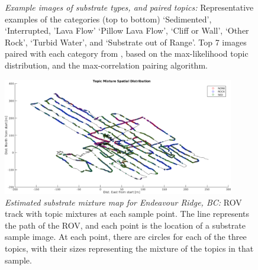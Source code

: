 \begin{figure}
\begin{minipage}{0.69\linewidth}
{            \label{fig:substrate-exout}
        }
    \end{minipage}
  \caption{
  	\emph{Example images of substrate types, and paired topics:}
    \protect{} Representative examples of the categories (top to bottom) `Sedimented', `Interrupted, 'Lava Flow'  `Pillow Lava Flow', `Cliff or Wall', `Other Rock', `Turbid Water', and `Substrate out of Range'.
	\protect{} Top 7 images paired with each category from
	\protect{}, based on the max-likelihood topic distribution, and the max-correlation pairing algorithm.
  }
  \label{fig:substrate-examples}
\end{figure}%

\begin{figure}
    \centering
    \includegraphics[width=0.9\textwidth]{figures/wacv/mixture-map2.pdf}
    \caption{\emph{Estimated substrate mixture map for Endeavour Ridge, BC:} ROV track with topic mixtures at each sample point. The line represents the path of the ROV, and each point is the location of a substrate sample image. At each point, there are circles for each of the three topics, with their sizes representing the mixture of the topics in that sample.}
    \label{fig:substrate-topic-map}
\end{figure}

